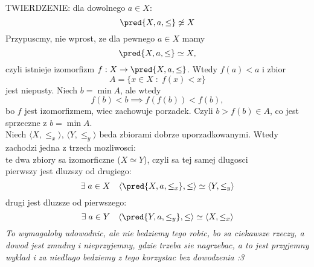 \documentclass{article}
\begin{document}
    {\large\color{emp}TWIERDZENIE}: dla dowolnego $a\in X$:
    $$\pred{X,a,\leq}\not\simeq X$$
    \dowod
    Przypuscmy, nie wprost, ze dla pewnego $a\in X$ mamy
    $$\pred{X, a,\leq}\simeq X,$$
    czyli istnieje {\color{acc}izomorfizm $f:X\to\pred{X,a,\leq}$}. Wtedy $f(a)<a$ i zbior
    $$A=\{x\in X\;:\;f(x)<x\}$$
    jest niepusty. Niech $b=\min A$, ale wtedy
    $$f(b)<b\implies f(f(b))<f(b),$$
    bo $f$ jest izomorfizmem, wiec zachowuje porzadek. {\color{acc}Czyli $b>f(b)\in A$, co jest sprzeczne z $b=\min A$}.\kondow
    \bigskip\\
    {\large Niech {\color{def}$\langle X,\leq_x\rangle$, $\langle Y,\leq_y\rangle$ beda zbiorami dobrze uporzadkowanymi}. Wtedy zachodzi jedna z trzech mozliwosci:}\smallskip\\
     te dwa zbiory sa izomorficzne ($X\simeq Y$), czyli sa tej samej dlugosci\smallskip\\
     pierwszy jest dluzszy od drugiego:
    $$\exists\;a\in X\quad \langle\pred{X, a, \leq_x},\leq\rangle\simeq\langle Y,\leq_y\rangle$$
     drugi jest dluzsze od pierwszego:
    $$\exists\;a\in Y\quad \langle\pred{Y, a, \leq_y},\leq\rangle\simeq\langle X,\leq_x\rangle$$
    \emph{To wymagaloby udowodnic, ale nie bedziemy tego robic, bo sa ciekawsze rzeczy, a dowod jest zmudny i nieprzyjemny, gdzie trzeba sie nagrzebac, a to jest przyjemny wyklad i za niedlugo bedziemy z tego korzystac bez dowodzenia :3}\bigskip\\
\end{document}
